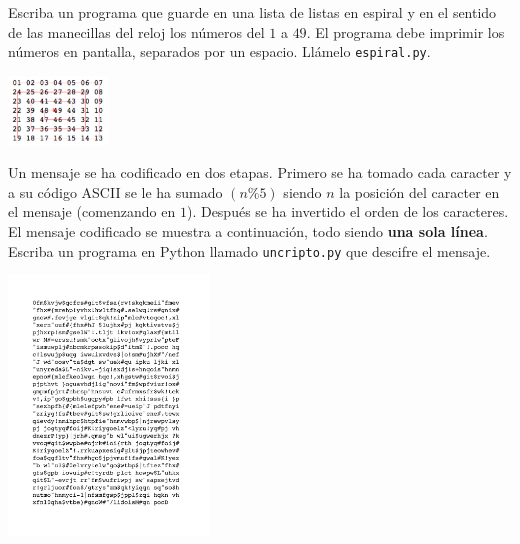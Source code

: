 \documentclass[11pt,letterpaper]{exam}
\begin{document}
\begin{questions}

Escriba un programa que guarde en una lista de listas en espiral y en el sentido de las manecillas del reloj los números del $1$ a $49$. El programa debe imprimir los números en pantalla, separados por un espacio. Llámelo \verb+espiral.py+.

\begin{center}
	\includegraphics[width=0.2\textwidth]{./spiral7.pdf}
\end{center}

%
%

Un mensaje se ha codificado en dos etapas. Primero se ha tomado cada caracter y a su código ASCII se le ha sumado $(n\%5)$ siendo $n$ la posición del caracter en el mensaje (comenzando en $1$). Después se ha invertido el orden de los caracteres. El mensaje codificado se muestra a continuación, todo siendo \textbf{una sola línea}. Escriba un programa en Python llamado \verb+uncripto.py+ que descifre el mensaje.

\begin{center}
	\includegraphics[width=0.40\textwidth]{./encrypted.pdf}
\end{center}

%

\end{questions}
\end{document}
